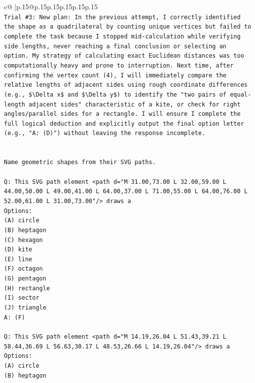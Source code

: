 \documentclass{article}
\begin{document}
{\begin{supertabular}{c@{$\;$}|p{.15\linewidth}@{}p{.15\linewidth}p{.15\linewidth}p{.15\linewidth}p{.15\linewidth}p{.15\linewidth}}
{{{\\ 
\texttt{Trial \#3: New plan: In the previous attempt, I correctly identified the shape as a quadrilateral by counting unique vertices but failed to complete the task because I stopped mid{-}calculation while verifying side lengths, never reaching a final conclusion or selecting an option. My strategy of calculating exact Euclidean distances was too computationally heavy and prone to interruption. Next time, after confirming the vertex count (4), I will immediately compare the relative lengths of adjacent sides using rough coordinate differences (e.g., \$\textbackslash{}Delta x\$ and \$\textbackslash{}Delta y\$) to identify the "two pairs of equal{-}length adjacent sides" characteristic of a kite, or check for right angles/parallel sides for a rectangle. I will ensure I complete the full logical deduction and explicitly output the final option letter (e.g., "A: (D)") without leaving the response incomplete.} \\
\\ 
\\ 
\texttt{Name geometric shapes from their SVG paths.} \\
\\ 
\texttt{Q: This SVG path element <path d="M 31.00,73.00 L 32.00,59.00 L 44.00,50.00 L 49.00,41.00 L 64.00,37.00 L 71.00,55.00 L 64.00,76.00 L 52.00,61.00 L 31.00,73.00"/> draws a} \\
\texttt{Options:} \\
\texttt{(A) circle} \\
\texttt{(B) heptagon} \\
\texttt{(C) hexagon} \\
\texttt{(D) kite} \\
\texttt{(E) line} \\
\texttt{(F) octagon} \\
\texttt{(G) pentagon} \\
\texttt{(H) rectangle} \\
\texttt{(I) sector} \\
\texttt{(J) triangle} \\
\texttt{A: (F)} \\
\\ 
\texttt{Q: This SVG path element <path d="M 14.19,26.04 L 51.43,39.21 L 58.44,36.69 L 56.63,30.17 L 48.53,26.66 L 14.19,26.04"/> draws a} \\
\texttt{Options:} \\
\texttt{(A) circle} \\
\texttt{(B) heptagon} \\
}}}
\end{supertabular}}
\end{document}
